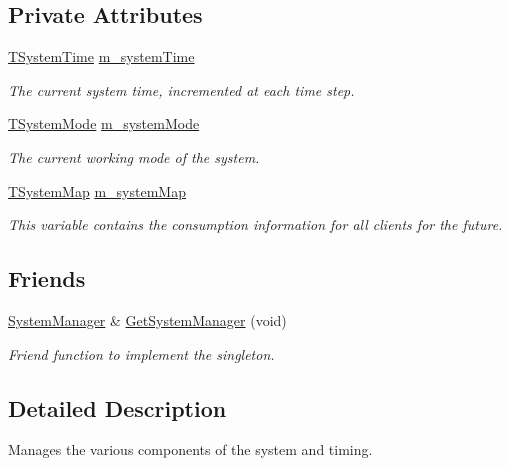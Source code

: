\subsection*{Private Attributes}
\begin{DoxyCompactItemize}
\item 
\hyperlink{class_system_manager_a9743ff4f23e7d957f5932780d8070099}{T\-System\-Time} \hyperlink{class_system_manager_af5a7fec3622669af269cbcf7b1b2af22}{m\-\_\-system\-Time}
\begin{DoxyCompactList}\small\item\em The current system time, incremented at each time step. \end{DoxyCompactList}\item 
\hyperlink{class_system_manager_aa32b3f50b8882c8aa7a9ca88ab7a43dd}{T\-System\-Mode} \hyperlink{class_system_manager_a25bf998fe8f48168e2ad4c3dfd3bad91}{m\-\_\-system\-Mode}
\begin{DoxyCompactList}\small\item\em The current working mode of the system. \end{DoxyCompactList}\item 
\hyperlink{class_system_manager_aae66953e62823ae14519c7e9b3925864}{T\-System\-Map} \hyperlink{class_system_manager_a74a1b7e836ad95da039de9eb367544c3}{m\-\_\-system\-Map}
\begin{DoxyCompactList}\small\item\em This variable contains the consumption information for all clients for the future. \end{DoxyCompactList}\end{DoxyCompactItemize}
\subsection*{Friends}
\begin{DoxyCompactItemize}
\item 
\hyperlink{class_system_manager}{System\-Manager} \& \hyperlink{class_system_manager_a97e64f74d188d41051488578800d20cd}{Get\-System\-Manager} (void)
\begin{DoxyCompactList}\small\item\em Friend function to implement the singleton. \end{DoxyCompactList}\end{DoxyCompactItemize}


\subsection{Detailed Description}
Manages the various components of the system and timing. 

